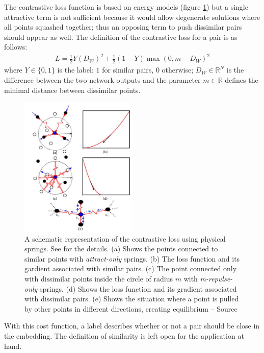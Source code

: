 \documentclass[a4paper,12pt]{report}
\newcommand{\R}{\mathbb{R}}
\begin{document}
The contrastive loss function is based on energy models (figure \ref{fig:contrastive_spring}) but a single attractive term is not sufficient because it would allow degenerate solutions where all points squashed together; thus an opposing term to push dissimilar pairs should appear as well.
The definition of the contrastive loss for a pair is as follows:
\begin{eqnarray}
    L = \frac{1}{2} Y (D_W)^2 + \frac{1}{2} (1-Y) \max(0, m - D_W)^2
\end{eqnarray}
where $Y \in \{0,1\}$ is the label: $1$ for similar pairs, $0$ otherwise; $D_W \in \R^N$ is the difference between the two network outputs and the parameter $m \in \R$ defines the minimal distance between dissimilar points.

\begin{figure}[h]
    \begin{center}
        \includegraphics[width=0.5\textwidth]{thesis_figures/contrastive_spring.jpg}
    \end{center}
    \caption{A schematic representation of the contrastive loss using physical springs. See \cite{hadsell2006dimensionality} for the details. (a) Shows the points connected to similar points with {\em attract-only} springs. (b) The loss function and its gardient associated with similar pairs. (c) The point connected only with dissimilar points inside the circle of radius $m$ with {\em m-repulse-only} springs. (d) Shows the loss function and its gradient associated with dissimilar pairs. (e) Shows the situation where a point is pulled by other points in different directions, creating equilibrium -- Source \cite{hadsell2006dimensionality}}
    \label{fig:contrastive_spring}
\end{figure}

With this cost function, a label describes whether or not a pair should be close in the embedding.
The definition of similarity is left open for the application at hand.
\end{document}
